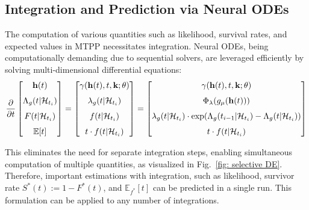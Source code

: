 \subsection{Integration and Prediction via Neural ODEs}

The computation of various quantities such as likelihood, survival rates, and expected values in MTPP necessitates integration. Neural ODEs, being computationally demanding due to sequential solvers, are leveraged efficiently by solving multi-dimensional differential equations:
\begin{align}
\label{eqn:multi-integral}
{\partial \over \partial t} 
\begin{bmatrix}
\mathbf{h}(t) \\[1.5ex] 
\Lambda_g (t |  \mathcal{H}_{t_i}) \\[1.5ex] 
F(t | \mathcal{H}_{t_i}) \\[1.5ex] 
\mathbb{E}[t]
\end{bmatrix}
= 
\begin{bmatrix}
\gamma (\mathbf{h}(t),t, \mathbf{k}; \theta) \\[1.5ex] 
\lambda_g(t | \mathcal{H}_{t_i}) \\[1.5ex] 
f(t|\mathcal{H}_{t_i}) \\[1.5ex] 
t \cdot f(t|\mathcal{H}_{t_i})
\end{bmatrix}
= 
\begin{bmatrix}
\gamma (\mathbf{h}(t),t,\mathbf{k}; \theta) \\[1.5ex] 
\Phi_\lambda( g_\mu(\mathbf{h}(t))) \\[1.5ex] 
\lambda_g(t|\mathcal{H}_{t_i}) \cdot \exp (\Lambda_g(t_{i-1}|\mathcal{H}_{t_i}) - \Lambda_g(t|\mathcal{H}_{t_i}) ) \\[1.5ex] 
t \cdot f(t|\mathcal{H}_{t_i}) 
\end{bmatrix}
\end{align}

This eliminates the need for separate integration steps, enabling simultaneous computation of multiple quantities, as visualized in Fig.~\ref{fig: selective DE}.
Therefore, important estimations with integration, such as likelihood, survivor rate $S ^* (t) := 1- F^*(t)$, and $\mathbb{E}_{f^*} [t]$ can be predicted in a single run. 
This formulation can be applied to any number of integrations.


